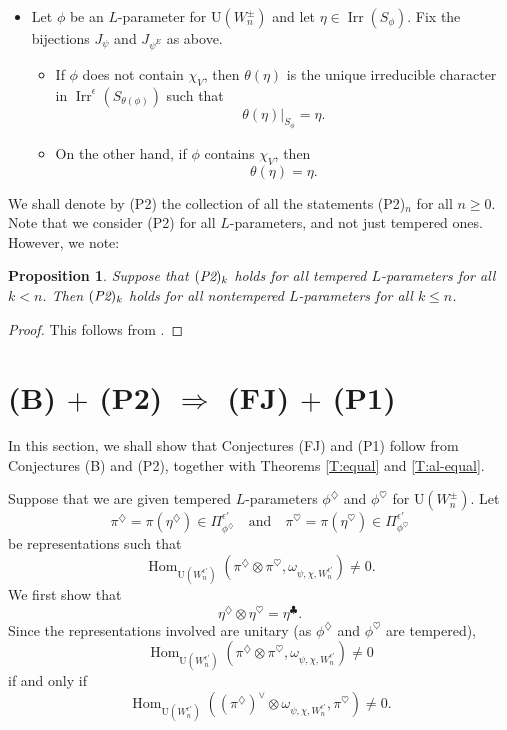 \documentclass[11pt]{amsart}
\numberwithin{equation}{section}
\theoremstyle{plain}
\newtheorem{prop}[thm]{Proposition}
\theoremstyle{definition}
\theoremstyle{remark}
\def\Hom{\operatorname{Hom}}
\def\Irr{\operatorname{Irr}}
\def\U{\mathrm{U}}
\begin{document}
\begin{itemize}
\item[(P2)$_n$]  

Let $\phi$ be an $L$-parameter for $\U(W_n^\pm)$ and let $\eta \in \Irr(S_\phi)$.
Fix the bijections $J_{\psi}$ and $J_{\psi^E}$ as above.

\begin{itemize}
\item If $\phi$ does not contain $\chi_V$, then $\theta(\eta)$ is the unique irreducible character in $\Irr^{\epsilon}(S_{\theta(\phi)})$ such that
 \[  \theta(\eta)|_{S_{\phi}}  =\eta. \]

\item On the other hand, if $\phi$ contains $\chi_V$, then
\[
 \theta(\eta) = \eta.
\]

\end{itemize}

\end{itemize}

We shall denote by (P2) the collection of all the statements (P2)$_n$ for all $n \ge 0$. Note that we consider (P2) for all $L$-parameters, and not just tempered ones. However, we note:

\begin{prop}  \label{P:P2nt}
Suppose that $(\emph{P2})_k$ holds for all tempered $L$-parameters for all $k < n$. Then $(\emph{P2})_k$ holds for all nontempered $L$-parameters for all $k \le n$.
\end{prop}

\begin{proof}
This follows from \cite[Proposition C.4(ii)]{gi}.
\end{proof}

\section{\textbf{(B) $+$ (P2) $\Longrightarrow$ (FJ) $+$ (P1)}}
\label{s:see-saw}

In this section, we shall show that Conjectures (FJ) and (P1) follow from Conjectures (B) and (P2), together with Theorems \ref{T:equal} and \ref{T:al-equal}.

Suppose that we are given tempered $L$-parameters $\phi^{\diamondsuit}$ and $\phi^{\heartsuit}$ for $\U(W_n^\pm)$. Let
\[ \pi^{\diamondsuit} = \pi(\eta^{\diamondsuit}) \in \Pi_{\phi^{\diamondsuit}}^{\epsilon'} \quad \text{and} \quad 
\pi^{\heartsuit} = \pi(\eta^{\heartsuit}) \in \Pi_{\phi^{\heartsuit}}^{\epsilon'} \]
be representations such that
\[  \Hom_{\U(W_n^{\epsilon'})}(\pi^{\diamondsuit} \otimes \pi^{\heartsuit}, \omega_{\psi, \chi, W_n^{\epsilon'}}) \ne 0. \]
We first show that
\[ \eta^{\diamondsuit} \otimes \eta^{\heartsuit} = \eta^{\clubsuit}. \]
Since the representations involved are unitary (as $\phi^{\diamondsuit}$ and $\phi^{\heartsuit}$ are tempered), 
\[ \Hom_{\U(W_n^{\epsilon'})}(\pi^{\diamondsuit} \otimes \pi^{\heartsuit}, \omega_{\psi, \chi, W_n^{\epsilon'}}) \ne 0 \]
if and only if
\[ \Hom_{\U(W_n^{\epsilon'})}( (\pi^{\diamondsuit})^{\vee} \otimes \omega_{\psi, \chi, W_n^{\epsilon'}},  \pi^{\heartsuit}) \ne 0. \]
\end{document}

